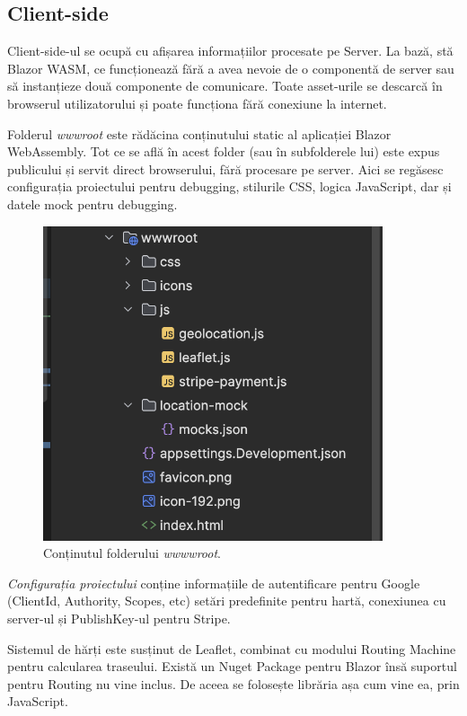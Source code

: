 \subsection{Client-side}

Client-side-ul se ocupă cu afișarea informațiilor procesate pe Server. La bază, stă
Blazor WASM, ce funcționează fără a avea nevoie de o componentă de server sau să instanțieze
două componente de comunicare. Toate asset-urile se descarcă în browserul utilizatorului și poate funcționa fără conexiune la internet.

Folderul \textit{wwwroot} este rădăcina conținutului static al aplicației Blazor WebAssembly. 
Tot ce se află în acest folder (sau în subfolderele lui) este expus publicului și servit direct browserului, fără procesare pe server.
Aici se regăsesc configurația proiectului pentru debugging, stilurile CSS, logica JavaScript, dar și datele mock pentru debugging.

\begin{figure}[H]
    \centering
    \includegraphics[width=10cm]{Assets/wwwroot.png}
    \caption{Conținutul folderului \textit{wwwwroot}.}
    \label{fig:wwwroot}
\end{figure}

\textit{Configurația proiectului} conține informațiile de autentificare pentru Google (ClientId, Authority, Scopes, etc)
setări predefinite pentru hartă, conexiunea cu server-ul și PublishKey-ul pentru Stripe.

Sistemul de hărți este susținut de Leaflet, combinat cu modului Routing Machine pentru calcularea traseului.
Există un Nuget Package pentru Blazor însă suportul pentru Routing nu vine inclus. De aceea se folosește librăria așa
cum vine ea, prin JavaScript.

